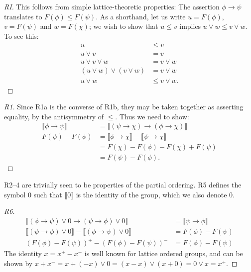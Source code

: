 \documentclass[preprint,leqno]{elsarticle}
\newcommand{\interp}[1]{\llbracket #1 \rrbracket}
\begin{document}
\begin{proof}[RI]
  This follows from simple lattice-theoretic properties: The assertion
  $\phi \rightarrow \psi$ translates to $F(\phi) \le F(\psi)$. As a
  shorthand, let us write $u = F(\phi)$, $v = F(\psi)$ and $w =
  F(\chi)$; we wish to show that $u\le v$ implies $u\lor w \le v \lor
  w$. To see this:
  \begin{align*}
    u &\le v\\
    u\lor v &= v\\
    u\lor v\lor w &= v\lor w\\
    (u\lor w)\lor (v\lor w) &= v\lor w\\
    u\lor w &\le v\lor w.
  \end{align*}
\end{proof}

\begin{proof}[R1]
  Since R1a is the converse of R1b, they may be taken together as
  asserting equality, by the antisymmetry of $\le$. Thus we need to
  show:
  \begin{align*}
    \interp{\phi \rightarrow \psi} & = \interp{(\psi \rightarrow
      \chi) \rightarrow (\phi \rightarrow \chi)}\\
    F(\psi) - F(\phi) & = \interp{\phi \rightarrow \chi} -
    \interp{\psi \rightarrow \chi}\\
    & = F(\chi) - F(\phi) - F(\chi) + F(\psi)\\
    & = F(\psi) - F(\phi).
  \end{align*}
\end{proof}
R2--4 are trivially seen to be properties of the partial ordering. R5
defines the symbol 0 such that $\interp{0}$ is the identity of the
group, which we also denote 0.

\begin{proof}[R6]
\begin{align*}
  \interp{(\phi \rightarrow \psi)\lor 0 \rightarrow (\psi \rightarrow \phi) \lor 0} &= \interp{\psi \rightarrow \phi}\\
  \interp{(\psi \rightarrow \phi) \lor 0} - \interp{(\phi \rightarrow \psi)\lor 0} &= F(\phi) - F(\psi)\\
  (F(\phi) - F(\psi))^+ - (F(\phi) - F(\psi))^- & =F(\phi) - F(\psi)
\end{align*}
The identity $x = x^+ - x^-$ is
well known for lattice ordered groups, and can be shown by $x + x^- =
x + (-x)\lor 0 = (x - x)\lor(x + 0) = 0\lor x = x^+$.
\end{proof}
\end{document}
